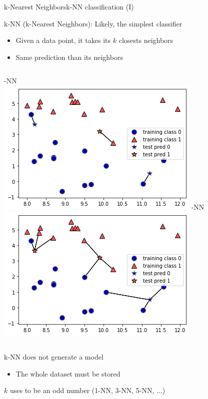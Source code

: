 \documentclass[10pt,compress]{beamer} %
\begin{document}
\begin{frame}{k-Nearest Neighbors}{k-NN classification (I)}

     k-NN (k-Nearest Neighbors): Likely, the simplest classifier
	\begin{itemize}
		\item Given a data point, it takes its $k$ closests neighbors
		\item Same prediction than its neighbors
	\end{itemize}

    \begin{columns}
        -NN\\
	        \includegraphics[width=\textwidth]{figs/1-nn.png}
         -NN\\
	        \includegraphics[width=\textwidth]{figs/3-nn.png}
    \end{columns}

    k-NN does not generate a model
    \begin{itemize}
		\item The whole dataset must be stored
	\end{itemize}
    $k$ uses to be an odd number (1-NN, 3-NN, 5-NN, ...)
\end{frame}
\end{document}
